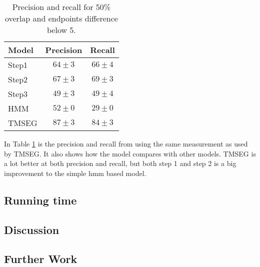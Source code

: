 \begin{table}
	\centering 
	\begin{tabular}{l|c|c} 
		Model & Precision & Recall \\ \hline
		Step1 & $64 \pm 3$ & $66 \pm 4$ \\ 
		Step2 & $67 \pm 3$ & $69 \pm 3$ \\ 
		Step3 & $49 \pm 3$ & $49 \pm 4$ \\
		HMM   & $52 \pm 0$ & $29 \pm 0$ \\
		TMSEG\cite{tmseg} & $87 \pm 3$ & $84 \pm 3$
	\end{tabular}
    \caption{Precision and recall for 50\% overlap and endpoints difference below 5.}
	\label{tab:pr50}
\end{table}

In Table \ref{tab:pr50} is the precision and recall from using the same 
measurement as used by TMSEG. It also shows how the model compares with 
other models. TMSEG is a lot better at both precision and recall, 
but both step 1 and step 2 is a big improvement to the simple \gls{hmm}
based model. 

\subsection{Running time}


\subsection{Discussion}


\subsection{Further Work}
